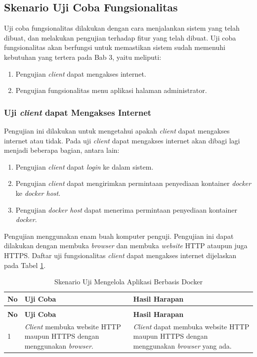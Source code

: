 \subsection{Skenario Uji Coba Fungsionalitas}
Uji coba fungsionalitas dilakukan dengan cara menjalankan sistem yang telah dibuat, dan melakukan pengujian terhadap fitur yang telah dibuat. Uji coba fungsionalitas akan berfungsi untuk memastikan sistem sudah memenuhi kebutuhan yang tertera pada Bab 3, yaitu meliputi:

\begin{enumerate}
\item Pengujian \textit{client} dapat mengakses internet.
\item Pengujian fungsionalitas menu aplikasi halaman administrator.
\end{enumerate}

\subsubsection{Uji \textit{client} dapat Mengakses Internet} \label{keempat}
Pengujian ini dilakukan untuk mengetahui apakah \textit{client} dapat mengakses internet atau tidak. Pada uji \textit{client} dapat mengakses internet akan dibagi lagi menjadi beberapa bagian, antara lain:
\begin{enumerate}
\item Pengujian \textit{client} dapat \textit{login} ke dalam sistem.
\item Pengujian \textit{client} dapat mengirimkan permintaan penyediaan kontainer \textit{docker} ke \textit{docker host}.
\item Pengujian \textit{docker host} dapat menerima permintaan penyediaan kontainer \textit{docker}.
\end{enumerate}

Pengujian menggunakan enam buah komputer penguji. Pengujian ini dapat dilakukan dengan membuka \textit{browser} dan membuka \textit{website} HTTP ataupun juga HTTPS. Daftar uji fungsionalitas \textit{client} dapat mengakses internet dijelaskan pada Tabel \ref{ujicoba4}.
\begin{longtable}{|p{}|p{}|p{}|}					\caption{Skenario Uji \textit{Client} dapat Mengakses Internet} \label{ujicoba4} \\
	\hline
	\textbf{No} & \textbf{Uji Coba} & \textbf{Hasil Harapan} \\ \hline
	\endfirsthead
	\caption[]{Skenario Uji Mengelola Aplikasi Berbasis Docker} \\
	\hline
	\textbf{No} & \textbf{Uji Coba} & \textbf{Hasil Harapan} \\ \hline
	\endhead
	\endfoot
	\endlastfoot
	
	1 & \textit{Client} membuka website HTTP maupun HTTPS dengan menggunakan \textit{browser}. & \textit{Client} dapat membuka website HTTP maupun HTTPS dengan menggunakan \textit{browser} yang ada.\\ \hline
\end{longtable}

